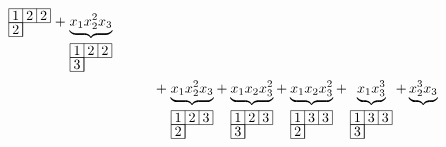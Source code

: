 \begin{align*}
{  \begin{tikzpicture}[scale=0.35, baseline=-0.5ex]
    \draw (0,0) rectangle (3,1);
    \draw (0,-1) rectangle (1,0);
    \draw (1,-1)--(1,1);
    \draw (2,0)--(2,1);
    \node at (0.5,0.5) {$1$};  \node at (1.5,0.5) {$2$}; \node at (2.5,0.5) {$2$};
    \node at (0.5,-0.5) {$2$};
  \end{tikzpicture}
  }
  +
  \underbrace{x_1x_2^2x_3}_{
  \begin{tikzpicture}[scale=0.35, baseline=-0.5ex]
    \draw (0,0) rectangle (3,1);
    \draw (0,-1) rectangle (1,0);
    \draw (1,-1)--(1,1);
    \draw (2,0)--(2,1);
    \node at (0.5,0.5) {$1$};  \node at (1.5,0.5) {$2$}; \node at (2.5,0.5) {$2$};
    \node at (0.5,-0.5) {$3$};
  \end{tikzpicture}
  } \\
  &\hspace{1cm}+
  \underbrace{x_1x_2^2x_3}_{
  \begin{tikzpicture}[scale=0.35, baseline=-0.5ex]
    \draw (0,0) rectangle (3,1);
    \draw (0,-1) rectangle (1,0);
    \draw (1,-1)--(1,1);
    \draw (2,0)--(2,1);
    \node at (0.5,0.5) {$1$};  \node at (1.5,0.5) {$2$}; \node at (2.5,0.5) {$3$};
    \node at (0.5,-0.5) {$2$};
  \end{tikzpicture}
  }
  +
  \underbrace{x_1x_2x_3^2}_{
  \begin{tikzpicture}[scale=0.35, baseline=-0.5ex]
    \draw (0,0) rectangle (3,1);
    \draw (0,-1) rectangle (1,0);
    \draw (1,-1)--(1,1);
    \draw (2,0)--(2,1);
    \node at (0.5,0.5) {$1$};  \node at (1.5,0.5) {$2$}; \node at (2.5,0.5) {$3$};
    \node at (0.5,-0.5) {$3$};
  \end{tikzpicture}
  }
  +
  \underbrace{x_1x_2x_3^2}_{
  \begin{tikzpicture}[scale=0.35, baseline=-0.5ex]
    \draw (0,0) rectangle (3,1);
    \draw (0,-1) rectangle (1,0);
    \draw (1,-1)--(1,1);
    \draw (2,0)--(2,1);
    \node at (0.5,0.5) {$1$};  \node at (1.5,0.5) {$3$}; \node at (2.5,0.5) {$3$};
    \node at (0.5,-0.5) {$2$};
  \end{tikzpicture}
  }
  +
  \underbrace{x_1x_3^3}_{
  \begin{tikzpicture}[scale=0.35, baseline=-0.5ex]
    \draw (0,0) rectangle (3,1);
    \draw (0,-1) rectangle (1,0);
    \draw (1,-1)--(1,1);
    \draw (2,0)--(2,1);
    \node at (0.5,0.5) {$1$};  \node at (1.5,0.5) {$3$}; \node at (2.5,0.5) {$3$};
    \node at (0.5,-0.5) {$3$};
  \end{tikzpicture}
  }
  +
  \underbrace{x_2^3x_3}_{
  \begin{tikzpicture}[scale=0.35, baseline=-0.5ex]

\end{tikzpicture}}
\end{align*}
